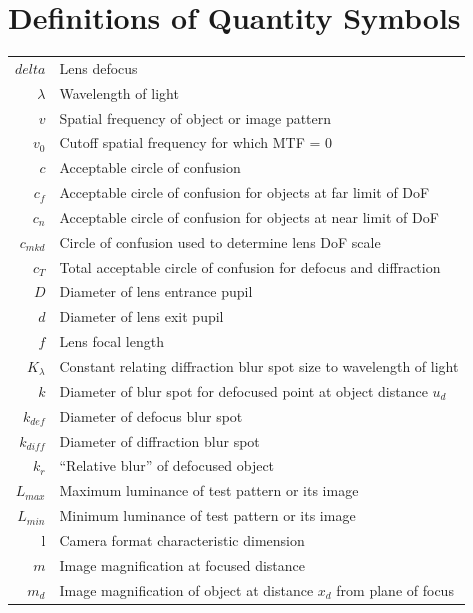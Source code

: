 \documentclass[11pt, oneside]{scrartcl}   	%
\begin{document}
\section{Definitions of Quantity Symbols}
\begin{center}
{\small
\begin{tabular}{r@{~=~}l}
$delta$ & Lens defocus     \\
$\lambda$ & Wavelength of light     \\
$v$ & Spatial frequency of object or image pattern     \\
$v_0$ & Cutoff spatial frequency for which MTF = 0      \\
$c$ & Acceptable circle of confusion     \\
$c_f$ & Acceptable circle of confusion for objects at far limit of DoF     \\
$c_n$ & Acceptable circle of confusion for objects at near limit of
        DoF     \\
$c_{mkd}$ & Circle of confusion used to determine lens DoF scale     \\
$c_T$ & Total acceptable circle of confusion for defocus and
        diffraction     \\
$D$ & Diameter of lens entrance pupil      \\
$d$ & Diameter of lens exit pupil     \\
$f$ & Lens focal length     \\
$K_\lambda$ & Constant relating diffraction blur spot size to
              wavelength of light     \\
$k$ & Diameter of blur spot for defocused point at object distance
      $u_d$     \\
$k_{def}$ & Diameter of defocus blur spot     \\
$k_{diff}$ & Diameter of diffraction blur spot     \\
$k_{r}$ & “Relative blur” of defocused object     \\
$L_{max}$ & Maximum luminance of test pattern or its image      \\
$L_{min}$ & Minimum luminance of test pattern or its image     \\
l & Camera format characteristic dimension\\
$m$ & Image magnification at  focused distance     \\
$m_{d}$ & Image magnification of object at distance $x_d$ from plane of
     focus      \\

\end{tabular}}
\end{center}
\end{document}
